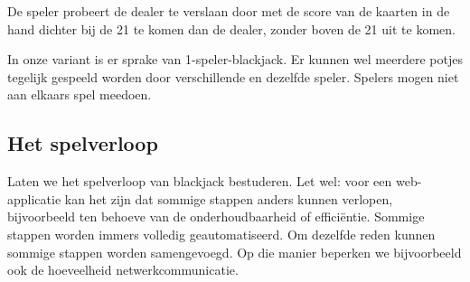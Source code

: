 \documentclass[dutch,a4paper,12pt,doubleside]{book}
\begin{document}
De speler probeert de dealer te verslaan door met de score van de kaarten 
in de hand dichter bij de 21 te komen dan de dealer, 
zonder boven de 21 uit te komen.

In onze variant is er sprake van 1-speler-blackjack. Er kunnen wel 
meerdere potjes tegelijk gespeeld worden door verschillende en dezelfde 
speler. Spelers mogen niet aan elkaars spel meedoen.

\subsection*{Het spelverloop}
Laten we het spelverloop van blackjack bestuderen.
Let wel: voor een web-applicatie kan het zijn dat sommige stappen
anders kunnen verlopen, bijvoorbeeld ten behoeve van de onderhoudbaarheid
of efficiëntie. Sommige stappen worden immers volledig geautomatiseerd. 
Om dezelfde reden kunnen sommige stappen worden samengevoegd. 
Op die manier beperken we bijvoorbeeld ook de hoeveelheid netwerkcommunicatie.
\end{document}
